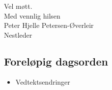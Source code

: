 \documentclass[12pt, norsk, a4paper]{proc}
\providecommand{\tightlist}{%
  \setlength{\itemsep}{0pt}\setlength{\parskip}{0pt}}
\begin{document}
Vel møtt.\\
% 
Med vennlig hilsen\\ Peter Hjelle Petersen-Øverleir\\
Nestleder

\hypertarget{foreluxf8pig-dagsorden}{%
\subsection*{Foreløpig dagsorden}\label{foreluxf8pig-dagsorden}}

\begin{itemize}
\tightlist
\item
    Vedtektsendringer
\end{itemize}
\end{document}
